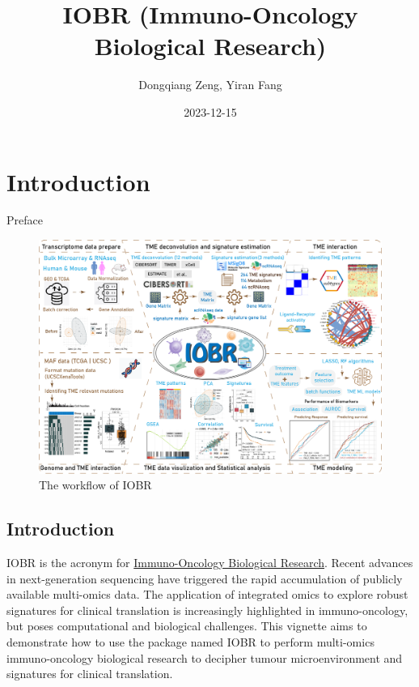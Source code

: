 \documentclass[
  12pt,
]{book}
\title{IOBR (Immuno-Oncology Biological Research)}
\author{Dongqiang Zeng, Yiran Fang}
\date{2023-12-15}
\begin{document}
\maketitle

{
\setcounter{tocdepth}{1}
\tableofcontents
}
\hypertarget{introduction}{%
\chapter*{\texorpdfstring{\textbf{Introduction}}{Introduction}}\label{introduction}}

Preface

\begin{figure}

{\centering \includegraphics[width=0.95\linewidth]{./fig/IOBR-Workflow} 

}

\caption{The workflow of IOBR}\label{fig:unnamed-chunk-1}
\end{figure}

\hypertarget{introduction-1}{%
\section{Introduction}\label{introduction-1}}

IOBR is the acronym for \href{https://github.com/IOBR/IOBR}{Immuno-Oncology Biological Research}.
Recent advances in next-generation sequencing have triggered the rapid accumulation of publicly available multi-omics data. The application of integrated omics to explore robust signatures for clinical translation is increasingly highlighted in immuno-oncology, but poses computational and biological challenges. This vignette aims to demonstrate how to use the package named IOBR to perform multi-omics immuno-oncology biological research to decipher tumour microenvironment and signatures for clinical translation.
\end{document}
